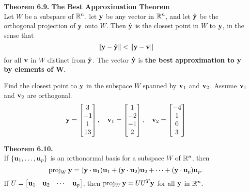 \newpage


\begin{boxthm}
	\textbf{Theorem 6.9.}
	\textbf{The Best Approximation Theorem} \\
	Let $W$ be a subspace of $\R^n$, let $\vect{y}$ be any vector in $\R^n$, and let $\yhat$ be the orthogonal projection of $\vect{y}$ onto $W$. Then $\yhat$ is the closest point in $W$ to $\vect{y}$, in the sense that
	$$ \|\vect{y}-\yhat\| < \|\vect{y}-\vect{v}\| $$
	for all $\vect{v}$ in $W$ distinct from $\yhat$. The vector $\yhat$ is \textbf{the best approximation to $\boldsymbol{\vect{y}}$ by elements of $\boldsymbol{W}$}.
\end{boxthm}


\begin{exercise} %
	Find the closest point to $\vect{y}$ in the subspace $W$ spanned by $\vect{v}_1$ and $\vect{v}_2$. Assume $\vect{v}_1$ and $\vect{v}_2$ are orthogonal.
	$$ \vect{y} = \begin{bmatrix}3\\-1\\1\\13\end{bmatrix}, \quad
	\vect{v}_1 = \begin{bmatrix}1\\-2\\-1\\2\end{bmatrix}, \quad
	\vect{v}_2 = \begin{bmatrix}-4\\1\\0\\3\end{bmatrix} $$
\end{exercise}
\vfill


\begin{boxthm}
	\textbf{Theorem 6.10.} \\
	If $\vectset[u]{1}{p}$ is an orthonormal basis for a subspace $W$ of $\R^n$, then
	$$ \proj_W\vect{y} = (\vect{y}\cdot\vect{u}_1)\vect{u}_1 + (\vect{y}\cdot\vect{u}_2)\vect{u}_2 + \cdots + (\vect{y}\cdot\vect{u}_p)\vect{u}_p. $$
	If $U=\begin{bmatrix}\vect{u}_1&\vect{u}_2&\cdots&\vect{u}_p\end{bmatrix}$, then
	$ \proj_W\vect{y} = UU^T\vect{y}$ for all $\vect{y}$ in $\R^n$.
\end{boxthm}


